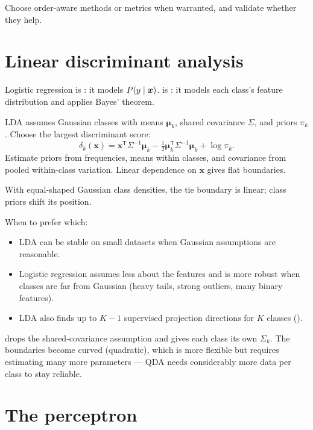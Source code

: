 Choose order-aware methods or metrics when warranted, and validate whether they help.

\section{Linear discriminant analysis}

Logistic regression is : it models $P(y\mathrel{|}\bm{x})$.  is : it models each class's feature distribution and applies Bayes' theorem.

LDA assumes Gaussian classes with means $\bm\mu_k$, shared covariance $\Sigma$, and priors $\pi_k$. Choose the largest discriminant score:
\[
  \delta_k(\bm{x})
  =\bm{x}^{\mathsf T}\Sigma^{-1}\bm{\mu}_k
  -\tfrac{1}{2}\bm{\mu}_k^{\mathsf T}\Sigma^{-1}\bm{\mu}_k
  +\log\pi_k.
\]
Estimate priors from frequencies, means within classes, and covariance from pooled within-class variation. Linear dependence on $\bm x$ gives flat boundaries.

\begin{intuition}
With equal-shaped Gaussian class densities, the tie boundary is linear; class priors shift its position.
\end{intuition}

When to prefer which:

\begin{itemize}
  \item LDA can be stable on small datasets when Gaussian assumptions are reasonable.
  \item Logistic regression assumes less about the features and is more robust when classes are far from Gaussian (heavy tails, strong outliers, many binary features).
  \item LDA also finds up to $K-1$ supervised projection directions for $K$ classes ().
\end{itemize}

 drops the shared-covariance assumption and gives each class its own $\Sigma_k$. The boundaries become curved (quadratic), which is more flexible but requires estimating many more parameters --- QDA needs considerably more data per class to stay reliable.

\section{The perceptron}

